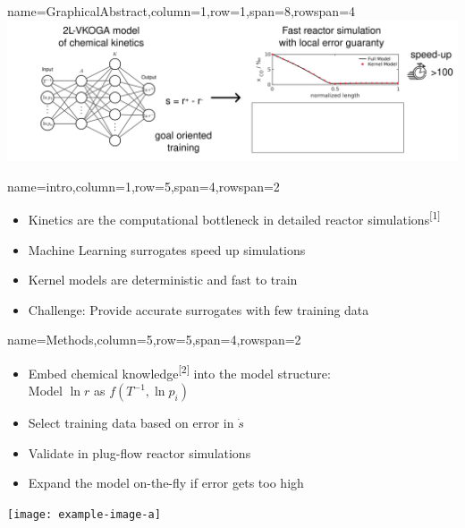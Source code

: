 \documentclass[
	accentcolor=3c,
	boxstyle=colored, %
	colorback=false,
	title=small
	]{tudasciposter}
\begin{document}
\begin{tcbposter}[
	poster={
		columns=8,
		rows=12,
		spacing=1cm,
	},]

\begin{posterboxenv}{name=GraphicalAbstract,column=1,row=1,span=8,rowspan=4}
	\centering
	\includegraphics[width=\textwidth]{abb/GA_draft}
\end{posterboxenv}

\begin{posterboxenv}[title=1. Introduction]{name=intro,column=1,row=5,span=4,rowspan=2}
	\begin{itemize}
		\item Kinetics are the computational bottleneck in detailed reactor simulations\textsuperscript{[1]}
		\item Machine Learning surrogates speed up simulations
		\item Kernel models are deterministic and fast to train 
		\item Challenge: Provide accurate surrogates with few training data
	\end{itemize}
\end{posterboxenv}

\begin{posterboxenv}[title=2. Methods]{name=Methods,column=5,row=5,span=4,rowspan=2}
	\begin{minipage}{0.675\textwidth}
	\begin{itemize}
		\item Embed chemical knowledge\textsuperscript{[2]} into the model structure:\\
		Model $\ln r$ as $f(T^{-1}, \ln p_i)$
		\item Select training data based on error in $\dot{s}$
		\item Validate in plug-flow reactor simulations
		\item Expand the model on-the-fly if error gets too high
	\end{itemize}
	\end{minipage}
	\begin{minipage}{0.3\textwidth}
		\texttt{[image: example-image-a]}
	\end{minipage}
\end{posterboxenv}


\end{tcbposter}
\end{document}
